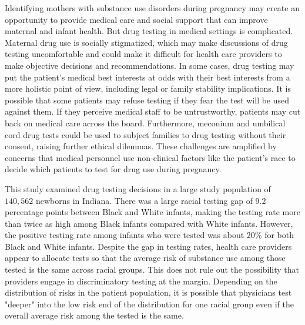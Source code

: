 Identifying mothers with substance use disorders during pregnancy may create an opportunity to provide medical care and social support that can improve maternal and infant health. But drug testing in medical settings is complicated. Maternal drug use is socially stigmatized, which may make discussions of drug testing uncomfortable and could make it difficult for health care providers to make objective decisions and recommendations. In some cases, drug testing may put the patient's medical best interests at odds with their best interests from a more holistic point of view, including legal or family stability implications. It is possible that some patients may refuse testing if they fear the test will be used against them. If they perceive medical staff to be untrustworthy, patients may cut back on medical care across the board. Furthermore, meconium and umbilical cord drug tests could be used to subject families to drug testing without their consent, raising further ethical dilemmas. These challenges are amplified by concerns that medical personnel use non-clinical factors like the patient's race to decide which patients to test for drug use during pregnancy. 

This study examined drug testing decisions in a large study population of $140,562$ newborns in Indiana. There was a large racial testing gap of 9.2 percentage points between Black and White infants, making the testing rate more than twice as high among Black infants compared with White infants. However, the positive testing rate among infants who were tested was about 20\% for both Black and White infants. Despite the gap in testing rates, health care providers appear to allocate tests so that the average risk of substance use among those tested is the same across racial groups. This does not rule out the possibility that providers engage in discriminatory testing at the margin. Depending on the distribution of risks in the patient population, it is possible that physicians test "deeper" into the low risk end of the distribution for one racial group even if the overall average risk among the tested is the same. 

